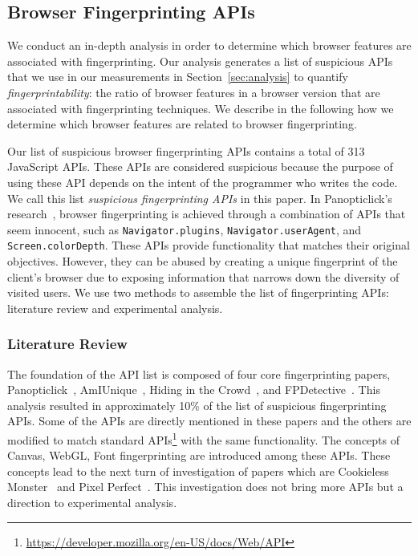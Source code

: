 \subsection{Browser Fingerprinting APIs}
\label{sec:fp-apis}

We conduct an in-depth analysis in order to determine which browser features are associated with fingerprinting. Our analysis generates a list of suspicious APIs that we use in our measurements in Section~\ref{sec:analysis} to quantify \textit{fingerprintability}: the ratio of browser features in a browser version that are associated with fingerprinting techniques. We describe in the following how we determine which browser features are related to browser fingerprinting.

Our list of suspicious browser fingerprinting APIs contains a total of 313 JavaScript APIs. These APIs are considered suspicious because the purpose of using these API depends on the intent of the programmer who writes the code. 
We call this list \textit{suspicious fingerprinting APIs} in this paper.
In Panopticlick's research~\cite{panopticlick}, browser fingerprinting is achieved through a combination of APIs that seem innocent, such as \texttt{Navigator.plugins}, \texttt{Navigator.userAgent}, and \texttt{Screen.colorDepth}. These APIs provide functionality that matches their original objectives. However, they can be abused by creating a unique fingerprint of the client's browser due to exposing information that narrows down the diversity of visited users. We use two methods to assemble the list of fingerprinting APIs: literature review and experimental analysis.

\subsubsection{Literature Review}

The foundation of the API list is composed of four core fingerprinting papers, Panopticlick~\cite{panopticlick}, AmIUnique~\cite{amiunique}, Hiding in the Crowd~\cite{hidinginthecrowd}, and FPDetective~\cite{fpdetective}. This analysis resulted in approximately 10\% of the list of suspicious fingerprinting APIs. Some of the APIs are directly mentioned in these papers and the others are modified to match standard APIs\footnote{\url{https://developer.mozilla.org/en-US/docs/Web/API}} with the same functionality. The concepts of Canvas, WebGL, Font fingerprinting are introduced among these APIs. These concepts lead to the next turn of investigation of papers which are Cookieless Monster~\cite{cookiemonster-SP13} and Pixel Perfect~\cite{mowery2012pixel}. This investigation does not bring more APIs but a direction to experimental analysis. 

